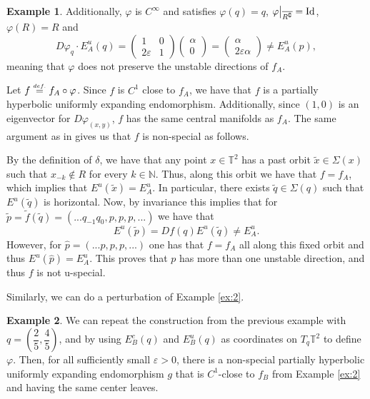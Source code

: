 \documentclass[a4paper,11pt,reqno]{amsart}
\newcommand\restr[2]{{ %
  \left.\kern-\nulldelimiterspace 
  #1 
  \vphantom{\big|} 
  \right|_{#2} 
  }}
\newcommand{\N}{{\mathbb N}}
\newcommand{\TT}{{\mathbb{T}^2}}
\newcommand{\eqdef}{\stackrel{\scriptscriptstyle\textrm def.}{=}}
\newcommand{\tix}{\tilde{x}}
\theoremstyle{definition}
\newtheorem{example}{Example}
\begin{document}
\begin{example}
Additionally, $\varphi$ is $C^\infty$ and satisfies $\varphi(q) = q$, $\restr{\varphi}{\overline{R^\complement}} = \operatorname{\operatorname{Id}}$, $\varphi(R) = R$ and
 $$D\varphi_{q} \cdot E^u_A(q) = \begin{pmatrix}
1 & 0 \\
2 \varepsilon & 1 
\end{pmatrix}\begin{pmatrix}
\alpha \\
0
\end{pmatrix} = \begin{pmatrix}
\alpha \\
2 \varepsilon \alpha
\end{pmatrix} \neq E^u_A(p),$$
meaning that $\varphi$ does not preserve the unstable directions of $f_A$.
 
 Let $f\eqdef f_A\circ\varphi$. Since $f$ is $C^1$ close to $f_A$, we have that $f$ is a partially hyperbolic uniformly expanding endomorphism. Additionally, since $(1,0)$ is an eigenvector for $D\varphi_{(x,y)}$, $f$ has the same central manifolds as $f_A$. The same argument as in \cite{CostaMicena2022} gives us that $f$ is non-special as follows.

 By the definition of $\delta$, we have that any point $x\in\TT$ has a past orbit $\tix\in\Sigma(x)$ such that $x_{-k}\notin R$ for every $k\in\N$. Thus, along this orbit we have that $f=f_A$, which implies that $E^u(\tix)=E^u_A$.	In particular, there exists $\tilde{q}\in\Sigma(q)$ such that $E^u(\tilde{q})$ is horizontal. Now, by invariance this implies that for $\tilde{p}= \tilde{f}(\tilde{q}) = (...q_{-1}q_0,p,p,p,...)$ we have that
 \[
 E^u(\tilde{p})=Df(q)E^u(\tilde{q})\neq E^u_A.
 \]
 However, for $\hat{p}=(...p,p,p,...)$ one has that $f=f_A$ all along this fixed orbit and thus $E^u(\hat{p})=E^u_A$. This proves that $p$ has more than one unstable direction, and thus $f$ is not u-special. 

    
\end{example}

Similarly, we can do a perturbation of Example \ref{ex:2}.

\begin{example}
    \label{ex:4}
    We can repeat the construction from the previous example with $q = \left( \dfrac{2}{5}, \dfrac{4}{5} \right)$, and by using $E^c_B(q)$ and $E^u_B(q)$ as coordinates on $T_q\TT$ to define $\varphi$.
    Then, for all sufficiently small $\varepsilon > 0$, there is a non-special partially hyperbolic uniformly expanding endomorphism $g$ that is $C^1$-close to $f_B$ from Example \ref{ex:2} and having the same center leaves.
\end{example}
\end{document}
